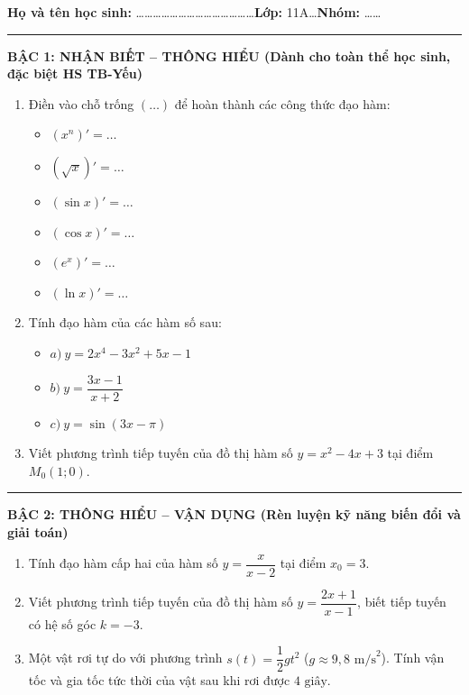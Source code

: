 \documentclass[12pt, a4paper]{article}
\begin{document}
\begin{tcolorbox}[enhanced, colback=white, colframe=blue!70!black, arc=1.5mm, title=\textbf{PHIẾU HỌC TẬP: ÔN TẬP BÀI TẬP CUỐI CHƯƠNG IX}]
\textbf{Họ và tên học sinh:} \dots\dots\dots\dots\dots\dots\dots\dots\dots\dots\dots\dots\dots\dots \textbf{Lớp:} 11A\dots \quad \textbf{Nhóm:} \dots\dots

\vspace{3pt}
\hrule
\vspace{5pt}

\textbf{\large BẬC 1: NHẬN BIẾT -- THÔNG HIỂU (Dành cho toàn thể học sinh, đặc biệt HS TB-Yếu)}
\begin{enumerate}[label=\textbf{Bài 1.\arabic*.}]
    \item Điền vào chỗ trống $(\dots)$ để hoàn thành các công thức đạo hàm:
    \begin{itemize}[leftmargin=0.6cm]
        \item $(x^n)' = \dots$
        \item $(\sqrt{x})' = \dots$
        \item $(\sin x)' = \dots$
        \item $(\cos x)' = \dots$
        \item $(e^x)' = \dots$
        \item $(\ln x)' = \dots$
    \end{itemize}
    \item Tính đạo hàm của các hàm số sau:
    \begin{itemize}[leftmargin=0.6cm]
        \item $a) \ y = 2x^4 - 3x^2 + 5x - 1$
        \item $b) \ y = \dfrac{3x - 1}{x + 2}$
        \item $c) \ y = \sin(3x - \pi)$
    \end{itemize}
    \item Viết phương trình tiếp tuyến của đồ thị hàm số $y = x^2 - 4x + 3$ tại điểm $M_0(1; 0)$.
\end{enumerate}

\vspace{5pt}
\hrule
\vspace{5pt}

\textbf{\large BẬC 2: THÔNG HIỂU -- VẬN DỤNG (Rèn luyện kỹ năng biến đổi và giải toán)}
\begin{enumerate}[label=\textbf{Bài 2.\arabic*.}]
    \item Tính đạo hàm cấp hai của hàm số $y = \dfrac{x}{x - 2}$ tại điểm $x_0 = 3$.
    \item Viết phương trình tiếp tuyến của đồ thị hàm số $y = \dfrac{2x + 1}{x - 1}$, biết tiếp tuyến có hệ số góc $k = -3$.
    \item Một vật rơi tự do với phương trình $s(t) = \dfrac{1}{2}gt^2$ ($g \approx 9{,}8\text{ m/s}^2$). Tính vận tốc và gia tốc tức thời của vật sau khi rơi được $4\text{ giây}$.
\end{enumerate}


\end{tcolorbox}
\end{document}
